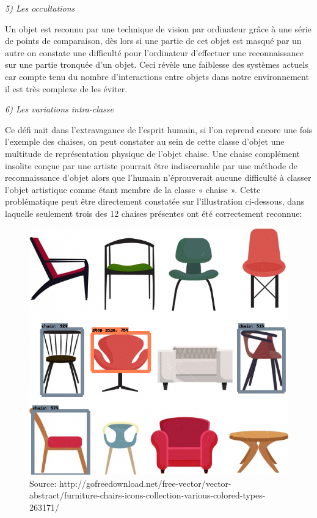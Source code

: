 \documentclass[a4paper,12pt]{article} %
\begin{document}
\textit{5)	Les occultations}\newline

Un objet est reconnu par une technique de vision par ordinateur grâce à une série de points de comparaison, dès lors si une partie de cet objet est masqué par un autre on constate une difficulté pour l’ordinateur d’effectuer une reconnaissance sur une partie tronquée d’un objet. Ceci révèle une faiblesse des systèmes actuels car compte tenu du nombre d’interactions entre objets dans notre environnement il est très complexe de les éviter. \newline

\textit{6)	Les variations intra-classe}\newline

Ce défi nait dans l’extravagance de l’esprit humain, si l’on reprend encore une fois l’exemple des chaises, on peut constater au sein de cette classe d’objet une multitude de représentation physique de l’objet chaise. Une chaise complément insolite conçue par une artiste pourrait être indiscernable par une méthode de reconnaissance d’objet alors que l’humain n’éprouverait aucune difficulté à classer l’objet artistique comme étant membre de la classe « chaise ». Cette problématique peut être directement constatée sur l'illustration ci-dessous, dans laquelle seulement trois des 12 chaises présentes ont été correctement reconnue:\newline
\begin{figure}[h] %
  \centering %
  \includegraphics[scale=0.27]{chairAfterReco.png} %
  \caption{Source: http://gofreedownload.net/free-vector/vector-abstract/furniture-chairs-icons-collection-various-colored-types-263171/} %
\end{figure}
\newpage
\end{document}
